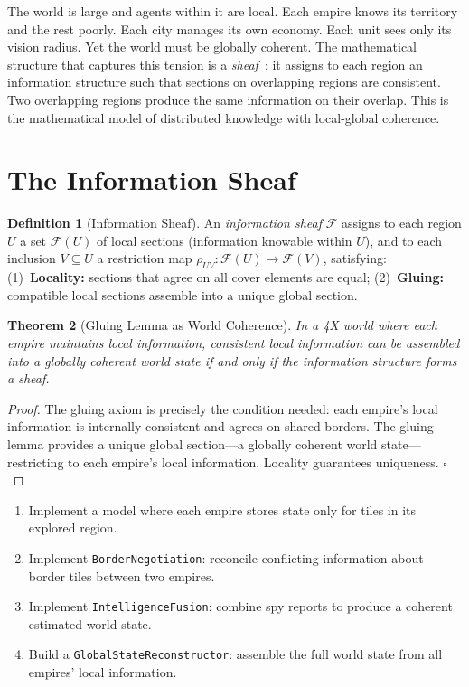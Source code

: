 \documentclass[11pt,a4paper,openany]{book}
\theoremstyle{plain}
\newtheorem{theorem}{Theorem}[chapter]
\theoremstyle{definition}
\newtheorem{definition}[theorem]{Definition}
\theoremstyle{remark}
\newenvironment{background}{%
  \begin{mdframed}[
    linecolor=sphereblue!40, backgroundcolor=sphereblue!5,
    linewidth=1pt, innertopmargin=8pt, innerbottommargin=8pt,
    innerleftmargin=10pt, innerrightmargin=10pt,
    skipabove=10pt, skipbelow=6pt
  ]%
  \setlength{\parindent}{0pt}%
  \noindent{\textcolor{sphereblue}{\textbf{Background}}}\par\smallskip\ignorespaces
}{\end{mdframed}}
\newenvironment{project}[1]{%
  \begin{tcolorbox}[
    title={\textbf{Project: #1}},
    colback=projectbg,
    colframe=sphereblue,
    fonttitle=\bfseries\color{white},
    coltitle=white,
    attach boxed title to top left={yshift=-2mm, xshift=4mm},
    boxed title style={colback=sphereblue, sharp corners},
    sharp corners,
    breakable,
    before upper={\normalfont\setlength{\parindent}{0pt}\tolerance=9999\hbadness=9999}
  ]
}{\end{tcolorbox}}
\begin{document}
\begin{background}
  The world is large and agents within it are local. Each empire knows
  its territory and the rest poorly. Each city manages its own economy.
  Each unit sees only its vision radius. Yet the world must be globally
  coherent. The mathematical structure that captures this tension is a
  \emph{sheaf}~\cite{Spivak}: it assigns to each region an information
  structure such that sections on overlapping regions are consistent.
  Two overlapping regions produce the same information on their overlap.
  This is the mathematical model of distributed knowledge with
  local-global coherence.
\end{background}

\section{The Information Sheaf}

\begin{definition}[Information Sheaf]
  An \emph{information sheaf} $\mathcal{F}$ assigns to each region $U$
  a set $\mathcal{F}(U)$ of local sections (information knowable within $U$),
  and to each inclusion $V \subseteq U$ a restriction map
  $\rho_{UV} : \mathcal{F}(U) \to \mathcal{F}(V)$, satisfying:
  (1)~\textbf{Locality:} sections that agree on all cover elements are equal;
  (2)~\textbf{Gluing:} compatible local sections assemble into a unique
  global section.
\end{definition}

\begin{theorem}[Gluing Lemma as World Coherence]
  In a 4X world where each empire maintains local information, consistent
  local information can be assembled into a globally coherent world state
  if and only if the information structure forms a sheaf.
\end{theorem}
\begin{proof}
  The gluing axiom is precisely the condition needed: each empire's local
  information is internally consistent and agrees on shared borders.
  The gluing lemma provides a unique global section---a globally coherent
  world state---restricting to each empire's local information.
  Locality guarantees uniqueness. $\square$
\end{proof}

\begin{project}{Distributed AI Information Systems}
  \begin{enumerate}
    \item Implement a model where each empire stores state only for
          tiles in its explored region.
    \item Implement \texttt{BorderNegotiation}: reconcile conflicting
          information about border tiles between two empires.
    \item Implement \texttt{IntelligenceFusion}: combine spy reports
          to produce a coherent estimated world state.
    \item Build a \texttt{GlobalStateReconstructor}: assemble the full
          world state from all empires' local information.
  \end{enumerate}
\end{project}
\end{document}
